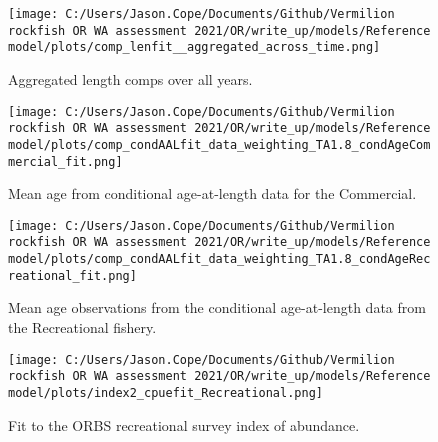 \documentclass[11pt,
  english,
  a4paper,
]{article}
\begin{document}
\tagmcend\tagstructend


\begin{figure}
\centering
\texttt{[image: C:/Users/Jason.Cope/Documents/Github/Vermilion rockfish OR WA assessment 2021/OR/write\_up/models/Reference model/plots/comp\_lenfit\_\_aggregated\_across\_time.png]}
\caption{Aggregated length comps over all years.\label{fig:agg-len-fit}}
\end{figure}

\tagmcend\tagstructend


\begin{figure}
\centering
\texttt{[image: C:/Users/Jason.Cope/Documents/Github/Vermilion rockfish OR WA assessment 2021/OR/write\_up/models/Reference model/plots/comp\_condAALfit\_data\_weighting\_TA1.8\_condAgeCommercial\_fit.png]}
\caption{Mean age from conditional age-at-length data for the Commercial.\label{fig:com-mean-caal}}
\end{figure}

\tagmcend\tagstructend


\begin{figure}
\centering
\texttt{[image: C:/Users/Jason.Cope/Documents/Github/Vermilion rockfish OR WA assessment 2021/OR/write\_up/models/Reference model/plots/comp\_condAALfit\_data\_weighting\_TA1.8\_condAgeRecreational\_fit.png]}
\caption{Mean age observations from the conditional age-at-length data from the Recreational fishery.\label{fig:rec-mean-caal}}
\end{figure}

\tagmcend\tagstructend


\begin{figure}
\centering
\texttt{[image: C:/Users/Jason.Cope/Documents/Github/Vermilion rockfish OR WA assessment 2021/OR/write\_up/models/Reference model/plots/index2\_cpuefit\_Recreational.png]}
\caption{Fit to the ORBS recreational survey index of abundance.\label{fig:orbs-index-fit}}
\end{figure}
\end{document}
